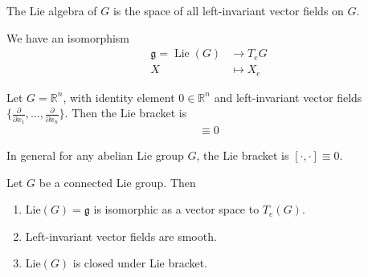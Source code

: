 \documentclass[11pt,a4paper]{scrarticle}
\theoremstyle{definition}
\theoremstyle{greenbox}
\newcommand{\R}{\mathbb{R}}
\begin{document}
    \begin{defn}
        The Lie algebra of $ G $ is the space of all left-invariant vector fields on $ G $. 
        
    \end{defn}
    We have an  isomorphism \begin{align*}
        \mathfrak{g}  = \operatorname{Lie}(G) &\to T_{e}G\\ 
        X &\mapsto X_{e}
    \end{align*}
    \begin{example}
        Let $ G = \R^{n} $, with identity element $ 0 \in \R^{n} $ and left-invariant vector fields $ \{ \frac{ \partial}{ \partial x_{1}}, \ldots, \frac{ \partial}{ \partial x_{n}}\} $. Then the Lie bracket is \begin{align*}
            [\cdot, \cdot ] \equiv 0
        \end{align*}
    \end{example}
    \begin{remark}
        In general for any abelian Lie group $ G $, the Lie bracket is $ [\cdot, \cdot ] \equiv 0 $.
    \end{remark}
    \begin{thm}
        Let $ G $ be a connected Lie group. Then \begin{enumerate}
            \item Lie$ (G)  = \mathfrak{g}$ is isomorphic as a vector space to $ T_{e}(G) $.
            \item Left-invariant vector fields are smooth. 
            \item Lie$ (G) $ is closed under Lie bracket. 
        \end{enumerate}
    \end{thm}
\end{document}
